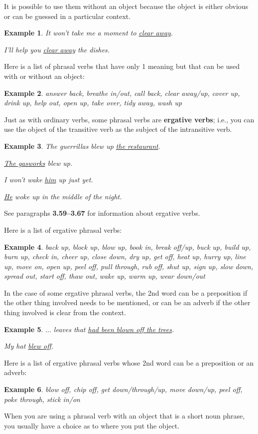 \documentclass[oneside]{book}
\numberwithin{equation}{section}
\newtheorem{example}{Example}[section]
\begin{document}
It is possible to use them without an object because the object is either obvious or can be guessed in a particular context.
\begin{example}
    It won't take me a moment to \underline{clear away}.
    
    I'll help you \underline{clear away} the dishes.
\end{example}
%
\noindent{} Here is a list of phrasal verbs that have only 1 meaning but that can be used with or without an object:
\begin{example}
    answer back, breathe in/out, call back, clear away/up, cover up, drink up, help out, open up, take over, tidy away, wash up
\end{example}
%
\noindent{} Just as with ordinary verbs, some phrasal verbs are \textbf{ergative verbs}; i.e., you can use the object of the transitive verb as the subject of the intransitive verb.
\begin{example}
    The guerrillas blew up \underline{the restaurant}.
    
    \underline{The gasworks} blew up.
    
    I won't wake \underline{him} up just yet.
    
    \underline{He} woke up in the middle of the night.
\end{example}
See paragraphs \textbf{3.59--3.67} for information about ergative verbs.

%
\noindent{} Here is a list of ergative phrasal verbs:
\begin{example}
    back up, block up, blow up, book in, break off/up, buck up, build up, burn up, check in, cheer up, close down, dry up, get off, heat up, hurry up, line up, move on, open up, peel off, pull through, rub off, shut up, sign up, slow down, spread out, start off, thaw out, wake up, warm up, wear down/out
\end{example}
%
\noindent{} In the case of some ergative phrasal verbs, the 2nd word can be a preposition if the other thing involved needs to be mentioned, or can be an adverb if the other thing involved is clear from the context.
\begin{example}
    $\ldots$ leaves that \underline{had been blown off the trees}.
    
    My hat \underline{blew off}.
\end{example}
%
\noindent{} Here is a list of ergative phrasal verbs whose 2nd word can be a preposition or an adverb:
\begin{example}
    blow off, chip off, get down/through/up, move down/up, peel off, poke through, stick in/on
\end{example}
%
\noindent{} When you are using a phrasal verb with an object that is a short noun phrase, you usually have a choice as to where you put the object.
\end{document}
